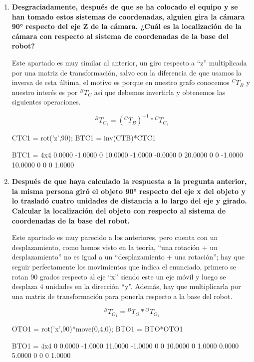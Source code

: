 \documentclass[11pt,a4paper]{article}
\begin{document}
\begin{enumerate}
    \item \textbf{Desgraciadamente, después de que se ha colocado el equipo y se han tomado estos sistemas de  coordenadas, alguien gira la cámara 90° respecto del eje Z de la cámara. ¿Cuál es la localización de  la cámara con respecto al sistema de coordenadas de la base del robot?}
    
    Este apartado es muy similar al anterior, un giro respecto a ``z'' multiplicada por una matriz de transformación, salvo con la diferencia de que usamos la inversa de esta última, el motivo es porque en nuestro grafo conocemos $^CT_B$ y nuestro interés es por $^BT_C$ así que debemos invertirla y obtenemos las siguientes operaciones.
    
    \[^BT_{C_1} = \left({}^CT_B\right)^{-1} * {}^CT_{C_1}\]
    
\begin{matlabcode}
CTC1 = rot('z',90);
BTC1 = inv(CTB)*CTC1
\end{matlabcode}
\begin{matlaboutput}
BTC1 = 4x4    
    0.0000   -1.0000         0   10.0000
   -1.0000   -0.0000         0   20.0000
         0         0   -1.0000   10.0000
         0         0         0    1.0000
\end{matlaboutput}
    
    \item \textbf{Después de que haya calculado la respuesta a la pregunta anterior, la misma persona giró el objeto  90° respecto del eje x del objeto y lo trasladó cuatro unidades de distancia a lo largo del eje y girado.  Calcular la localización del objeto con respecto al sistema de coordenadas de la base del robot.}
    
    Este apartado es muy parecido a los anteriores, pero cuenta con un desplazamiento, como hemos visto en la teoría, ``una rotación + un desplazamiento'' no es igual a un ``desplazamiento + una rotación''; hay que seguir perfectamente los movimientos que indica el enunciado, primero se rotan 90 grados respecto al eje ``x'' siendo este un eje móvil y luego se desplaza 4 unidades en la dirección ``y''. Además, hay que multiplicarla por una matriz de transformación para ponerla respecto a la base del robot.
    
     \[^BT_{O_1} = {}^BT_O * {}^OT_{O_1}\]
    
\begin{matlabcode}
OTO1 = rot('x',90)*move(0,4,0);
BTO1 = BTO*OTO1
\end{matlabcode}
\begin{matlaboutput}
BTO1 = 4x4    
         0    0.0000   -1.0000   11.0000
   -1.0000         0         0   10.0000
         0    1.0000    0.0000    5.0000
         0         0         0    1.0000
\end{matlaboutput}
    

\end{enumerate}
\end{document}
